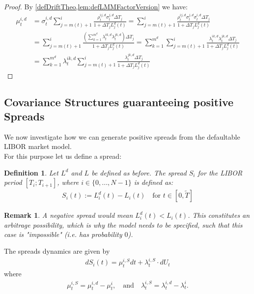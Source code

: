 \documentclass[12pt]{article}
\newtheorem{remark}[theorem]{Remark}
\newtheorem{definition}[theorem]{Definition}
\begin{document}
	\begin{proof}
		By \cref{defDriftTheo,lem:defLMMFactorVersion} we have:
		\begin{align*}
			\mu^{i, d}_t &= \sigma^{i, d}_t\sum_{j=m(t)+1}^{i}\frac{\rho^{i j, d}_t \sigma^{j, d}_t\Delta T_j}{1 + \Delta T_j L^d_j(t)} = \sum_{j=m(t)+1}^{i}\frac{\rho^{i j, d}_t \sigma^{j, d}_t \sigma^{i, d}_t\Delta T_j}{1 + \Delta T_j L^d_j(t)}\\
			&= \sum_{j=m(t)+1}^{i}\frac{\left(\sum_{k=1}^{m^d}\lambda^{i k,d}_t\lambda^{j k,d}_t\right)\Delta T_j}{1 + \Delta T_j L^d_j(t)}
			=\sum_{k=1}^{m^d}\sum_{j=m(t)+1}^{i}\frac{\lambda^{i k,d}_t\lambda^{j k,d}_t\Delta T_j}{1 + \Delta T_j L^d_j(t)}\\
			&= \sum_{k=1}^{m^d}\lambda^{i k,d}_t\sum_{j=m(t)+1}^{i}\frac{\lambda^{j k,d}_t\Delta T_j}{1 + \Delta T_j L^d_j(t)}
		\end{align*}
	\end{proof}
	
	
	\subsection{Covariance Structures guaranteeing positive Spreads}
	We now investigate how we can generate positive spreads from the defaultable LIBOR market model.\\
	For this purpose let us define a spread:
	\begin{definition}
		Let $L^d$ and $L$ be defined as before.
		The \emph{spread} $S_i$ for the LIBOR period $[T_i; T_{i+1}]$, where $i \in \{0, ..., N-1\}$ is defined as:
		\begin{align*}
			S_i(t) := L^d_i(t) - L_i(t) \quad \text{for } t \in \left[0,\tilde{T}\right]
		\end{align*}
	\end{definition}
	\begin{remark}
		A negative spread would mean $L^d_i(t) < L_i(t)$. This constitutes an arbitrage possibility, 
		which is why the model needs to be specified, such that this case is "impossible" (i.e. has probability $0$).
	\end{remark}
	The spreads dynamics are given by
	\begin{align*}
		dS_i(t) = \mu^{i,S}_t dt + \lambda^{i,S}_t \cdot dU_t
	\end{align*}
	where 
	\begin{align*}
		\mu^{i,S}_t = \mu^{i,d}_t - \mu^{i}_t, \quad \text{and} 
		\quad \lambda^{i,S}_t = \lambda^{i,d}_t - \lambda^{i}_t.
	\end{align*}
	
\end{document}
